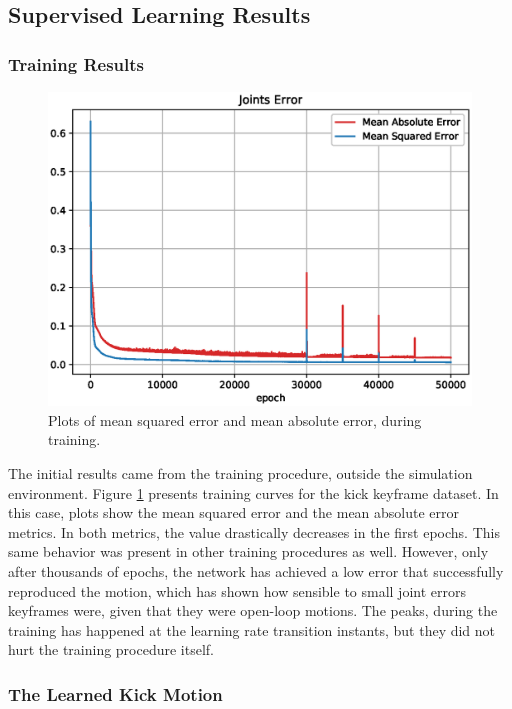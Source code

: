 \subsection{Supervised Learning Results}
\subsubsection{Training Results}

\begin{figure}[!htbp]
	\centering
	\includegraphics[width=1\textwidth]{Cap6/errors}
	\caption{Plots of mean squared error and mean absolute error, during training.}
	\label{fig:errors}
\end{figure}

The initial results came from the training procedure, outside the simulation environment. Figure \ref{fig:errors} presents training curves for the kick keyframe dataset. In this case, plots show the mean squared error and the mean absolute error metrics. In both metrics, the value drastically decreases in the first epochs. This same behavior was present in other training procedures as well. However, only after thousands of epochs, the network has achieved a low error that successfully reproduced the motion, which has shown how sensible to small joint errors keyframes were, given that they were open-loop motions. The peaks, during the training has happened at the learning rate transition instants, but they did not hurt the training procedure itself.

\subsubsection{The Learned Kick Motion}

